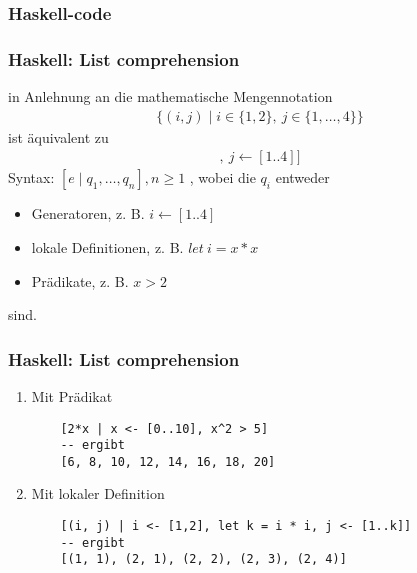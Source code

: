 \documentclass{beamer}
\begin{document}
\subsubsection{Haskell-code}

\begin{frame}[fragile]
\frametitle{Haskell: List comprehension}
in Anlehnung an die mathematische Mengennotation
\begin{gather*}
    \{(i,j) \mid i \in \{1, 2\},\: j \in \{1, \dots, 4\}\}
\end{gather*}
ist äquivalent zu
\begin{gather*}
    [(i, j) \mid i \leftarrow [1,2],\: j \leftarrow [1..4]]
\end{gather*}
Syntax: $[e \mid q_1, \dots, q_n], n \geq 1$ , wobei die $q_i$ entweder
\begin{itemize}
    \item Generatoren, z. B. $i \leftarrow \left[1..4\right]$
    \item lokale Definitionen, z. B. $let\:i = x * x$
    \item Prädikate, z. B. $x > 2$
\end{itemize}
sind.
\end{frame}

\begin{frame}[t, fragile]
\frametitle{Haskell: List comprehension}
\begin{examples}
\begin{enumerate}
    \item Mit Prädikat
    \begin{lstlisting}
    [2*x | x <- [0..10], x^2 > 5]
    -- ergibt
    [6, 8, 10, 12, 14, 16, 18, 20]
    \end{lstlisting}
    \item Mit lokaler Definition
    \begin{lstlisting}
    [(i, j) | i <- [1,2], let k = i * i, j <- [1..k]]
    -- ergibt
    [(1, 1), (2, 1), (2, 2), (2, 3), (2, 4)]
\end{lstlisting}
\end{enumerate}
\end{examples}
\end{frame}
\end{document}
